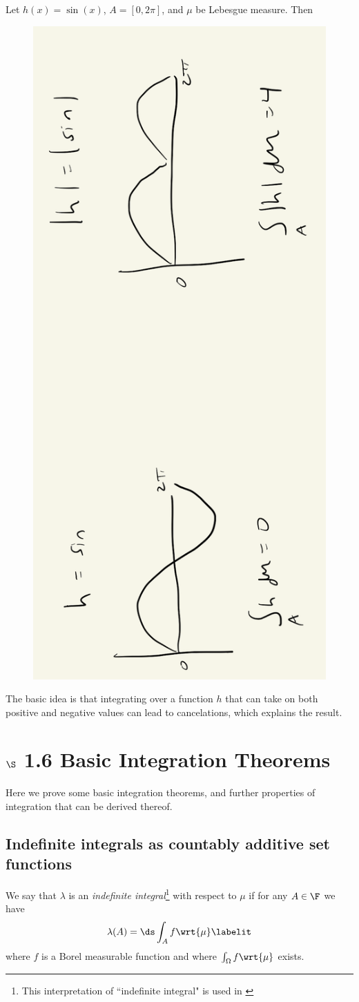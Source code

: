 \documentclass{article} %
\newcommand{\dmu}{\wrt{\mu}}
\begin{document}
\begin{example}{}
Let $h(x) = \sin(x)$, $A=[0,2\pi]$, and $\mu$ be Lebesgue measure. Then 
\begin{figure}[H]
\centering 
\includegraphics[width=.2\linewidth, angle=270]{images/triangle_inequality_for_integrals}	
\end{figure}
The basic idea is that integrating over a function $h$ that can take on both positive and negative values can lead to cancelations, which explains the result.	
\label{ex:simple_example_of_triangle_inequality}
\end{example}

 
\section{$\S$ 1.6 Basic Integration Theorems}

Here we prove some basic integration theorems, and further properties of integration that can be derived thereof.  %

\subsection{Indefinite integrals as countably additive set functions}

\begin{definition}
We say that $\lambda$ is an \textit{indefinite integral}\footnote{This interpretation of ``indefinite integral" is used in \cite[pp.~61]{ash2000probability}}  with respect to $\mu$ if for any $A \in \F$ we have
%
\begin{align*}
\lambda(A)  =  \ds\int_A f \dmu
\labelit \label{eqn:indefinite_integral}
\end{align*}
where $f$ is a Borel measurable function and where $\int_\Omega f \dmu$ exists.
\label{def:indefinite_integrals}	
\end{definition}
\end{document}
